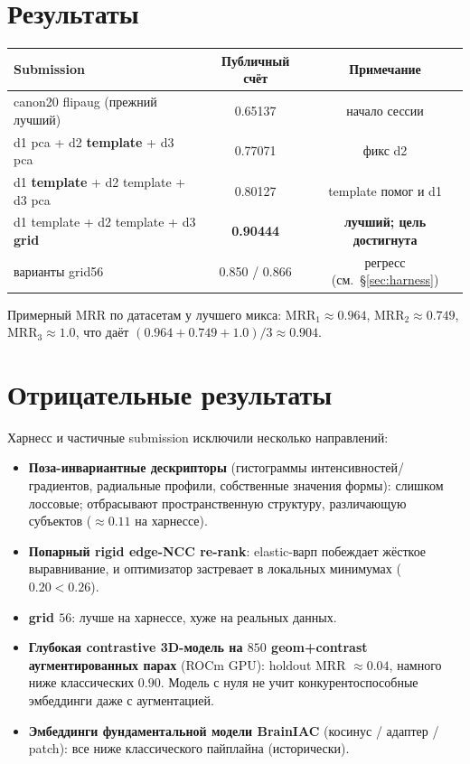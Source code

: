 \documentclass[11pt]{article}
\begin{document}
\section{Результаты}

\begin{center}
\begin{tabular}{@{}lcc@{}}
\toprule
Submission & Публичный счёт & Примечание \\
\midrule
canon20 flipaug (прежний лучший)              & 0.65137 & начало сессии \\
d1 pca + d2 \textbf{template} + d3 pca          & 0.77071 & фикс d2 \\
d1 \textbf{template} + d2 template + d3 pca     & 0.80127 & template помог и d1 \\
d1 template + d2 template + d3 \textbf{grid}    & \textbf{0.90444} & \textbf{лучший; цель достигнута} \\
варианты grid56                                & 0.850 / 0.866 & регресс (см.\ \S\ref{sec:harness}) \\
\bottomrule
\end{tabular}
\end{center}

\noindent Примерный MRR по датасетам у лучшего микса:
$\text{MRR}_1\!\approx\!0.964$, $\text{MRR}_2\!\approx\!0.749$,
$\text{MRR}_3\!\approx\!1.0$, что даёт $(0.964+0.749+1.0)/3\approx0.904$.

\section{Отрицательные результаты}

Харнесс и частичные submission исключили несколько направлений:
\begin{itemize}[nosep]
  \item \textbf{Поза-инвариантные дескрипторы} (гистограммы интенсивностей/градиентов,
        радиальные профили, собственные значения формы): слишком лоссовые; отбрасывают
        пространственную структуру, различающую субъектов ($\approx0.11$ на харнессе).
  \item \textbf{Попарный rigid edge-NCC re-rank}: elastic-варп побеждает жёсткое
        выравнивание, и оптимизатор застревает в локальных минимумах ($0.20<0.26$).
  \item \textbf{grid $56$}: лучше на харнессе, хуже на реальных данных.
  \item \textbf{Глубокая contrastive 3D-модель на $850$ geom+contrast аугментированных парах}
        (ROCm GPU): holdout MRR $\approx0.04$, намного ниже классических $0.90$. Модель
        с нуля не учит конкурентоспособные эмбеддинги даже с аугментацией.
  \item \textbf{Эмбеддинги фундаментальной модели BrainIAC} (косинус / адаптер / patch): все
        ниже классического пайплайна (исторически).
\end{itemize}
\end{document}
